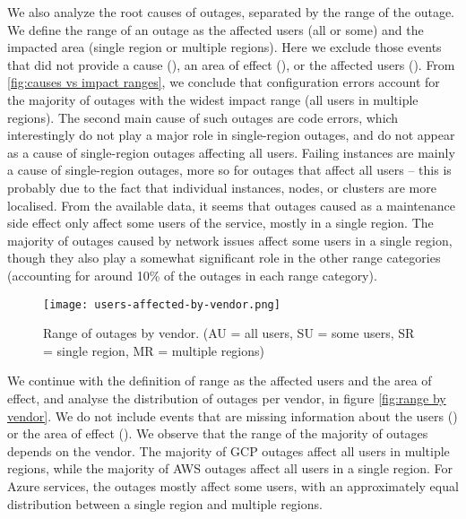 We also analyze the root causes of outages, separated by the range of the outage.
We define the range of an outage as the affected users (all or some) and the impacted area (single region or multiple regions).
Here we exclude those events that did not provide a cause (), an area of effect (), or the affected users ().
From \autoref{fig:causes vs impact ranges}, we conclude that configuration errors account for the majority of outages with the widest impact range (all users in multiple regions).
The second main cause of such outages are code errors, which interestingly do not play a major role in single-region outages, and do not appear as a cause of single-region outages affecting all users.
Failing instances are mainly a cause of single-region outages, more so for outages that affect all users -- this is probably due to the fact that individual instances, nodes, or clusters are more localised. %
From the available data, it seems that outages caused as a maintenance side effect only affect some users of the service, mostly in a single region.
The majority of outages caused by network issues affect some users in a single region, though they also play a somewhat significant role in the other range categories (accounting for around 10\% of the outages in each range category).

\begin{figure}[h]
  \centering
  \texttt{[image: users-affected-by-vendor.png]}
  \caption{Range of outages by vendor. (AU = all users, SU = some users, SR = single region, MR = multiple regions)}
  \label{fig:range by vendor}
\end{figure}

We continue with the definition of range as the affected users and the area of effect, and analyse the distribution of outages per vendor, in figure \autoref{fig:range by vendor}.
We do not include events that are missing information about the users () or the area of effect ().
We observe that the range of the majority of outages depends on the vendor.
The majority of GCP outages affect all users in multiple regions, while the majority of AWS outages affect all users in a single region.
For Azure services, the outages mostly affect some users, with an approximately equal distribution between a single region and multiple regions.

